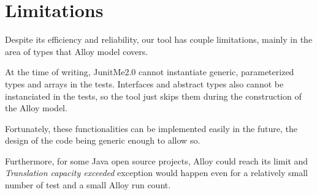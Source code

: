 \section{Limitations}
	Despite its efficiency and reliability, our tool has couple limitations, mainly in the area of types that Alloy model covers.
	
	At the time of writing, JunitMe2.0 cannot instantiate generic, parameterized types and arrays in the tests.
	Interfaces and abstract types also cannot be instanciated in the tests, so the tool just skips them during the construction of the Alloy model.
	
	Fortunately, these functionalities can be implemented easily in the future, the design of the code being generic enough to allow so.
	
	Furthermore, for some Java open source projects, Alloy could reach its limit and \textit{Translation capacity exceeded} exception would happen even for a relatively small number of test and a small Alloy run count. 